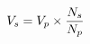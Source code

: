 \documentclass[preview]{standalone}
\begin{document}
\begin{align*}
\special{dvisvgm:raw <g id='unique000'>}V_s=V_p\times\frac{N_s}{N_p}\special{dvisvgm:raw </g>}
\end{align*}
\end{document}
